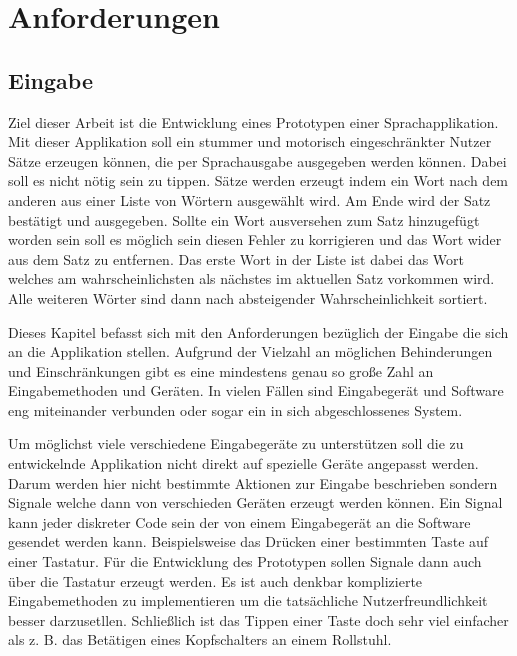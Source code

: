 \section{Anforderungen}
    
	\subsection{Eingabe}
    	Ziel dieser Arbeit ist die Entwicklung eines Prototypen einer Sprachapplikation. Mit dieser Applikation soll ein stummer und motorisch eingeschränkter Nutzer Sätze erzeugen können, die per Sprachausgabe ausgegeben werden können. Dabei soll es nicht nötig sein zu tippen. Sätze werden erzeugt indem ein Wort nach dem anderen aus einer Liste von Wörtern ausgewählt wird. Am Ende wird der Satz bestätigt und ausgegeben. Sollte ein Wort ausversehen zum Satz hinzugefügt worden sein soll es möglich sein diesen Fehler zu korrigieren und das Wort wider aus dem Satz zu entfernen. Das erste Wort in der Liste ist dabei das Wort welches am wahrscheinlichsten als nächstes im aktuellen Satz vorkommen wird. Alle weiteren Wörter sind dann nach absteigender Wahrscheinlichkeit sortiert.
         
    	Dieses Kapitel befasst sich mit den Anforderungen bezüglich der Eingabe die sich an die Applikation stellen. Aufgrund der Vielzahl an möglichen Behinderungen und Einschränkungen gibt es eine mindestens genau so große Zahl an Eingabemethoden und Geräten. In vielen Fällen sind Eingabegerät und Software eng miteinander verbunden oder sogar ein in sich abgeschlossenes System.
        
        Um möglichst viele verschiedene Eingabegeräte zu unterstützen soll die zu entwickelnde Applikation nicht direkt auf spezielle Geräte angepasst werden. Darum werden hier nicht bestimmte Aktionen zur Eingabe beschrieben sondern Signale welche dann von verschieden Geräten erzeugt werden können. Ein Signal kann jeder diskreter Code sein der von einem Eingabegerät an die Software gesendet werden kann. Beispielsweise das Drücken einer bestimmten Taste auf einer Tastatur. Für die Entwicklung des Prototypen sollen Signale dann auch über die Tastatur erzeugt werden. Es ist auch denkbar komplizierte Eingabemethoden zu implementieren um die tatsächliche Nutzerfreundlichkeit besser darzusetllen. Schließlich ist das Tippen einer Taste doch sehr viel einfacher als z. B. das Betätigen eines Kopfschalters an einem Rollstuhl. 
        
